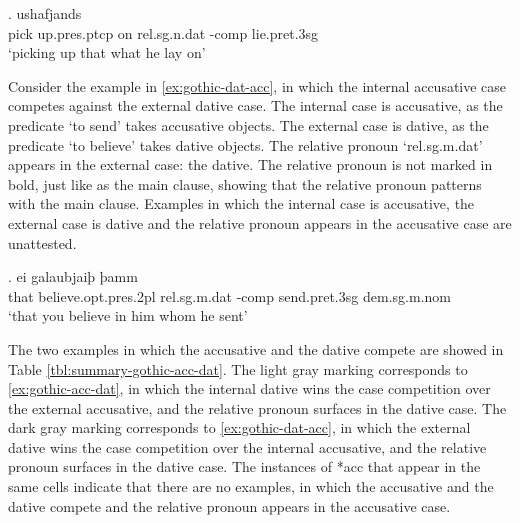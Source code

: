 \exg. ushafjands    \\
{pick up}.\ac{pres}.\ac{ptcp}\scsub{[acc]} on\scsub{[dat]} \ac{rel}.\ac{sg}.\ac{n}.\ac{dat} -\ac{comp} lie.\ac{pret}.3\ac{sg}\\
`picking up that what he lay on' \label{ex:gothic-acc-dat}

Consider the example in \ref{ex:gothic-dat-acc}, in which the internal accusative case competes against the external dative case.
The internal case is accusative, as the predicate  `to send' takes accusative objects.
The external case is dative, as the predicate  `to believe' takes dative objects.
The relative pronoun  `\ac{rel}.\ac{sg}.\ac{m}.\ac{dat}' appears in the external case: the dative. The relative pronoun is not marked in bold, just like as the main clause, showing that the relative pronoun patterns with the main clause.
Examples in which the internal case is accusative, the external case is dative and the relative pronoun appears in the accusative case are unattested.

\exg. ei galaubjaiþ þamm   \\
that believe.\ac{opt}.\ac{pres}.2\ac{pl}\scsub{[dat]} \ac{rel}.\ac{sg}.\ac{m}.\ac{dat} -\ac{comp} {send}.\ac{pret}.3\ac{sg}\scsub{[acc]} \ac{dem}.\ac{sg}.\ac{m}.\ac{nom}\\
`that you believe in him whom he sent' \label{ex:gothic-dat-acc}

The two examples in which the accusative and the dative compete are showed in Table \ref{tbl:summary-gothic-acc-dat}. The light gray marking corresponds to \ref{ex:gothic-acc-dat}, in which the internal dative wins the case competition over the external accusative, and the relative pronoun surfaces in the dative case. The dark gray marking corresponds to \ref{ex:gothic-dat-acc}, in which the external dative wins the case competition over the internal accusative, and the relative pronoun surfaces in the dative case. The instances of *\ac{acc} that appear in the same cells indicate that there are no examples, in which the accusative and the dative compete and the relative pronoun appears in the accusative case.

